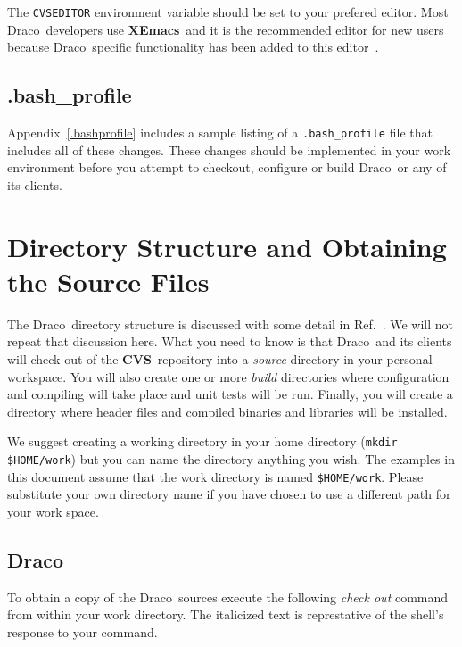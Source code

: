 \documentclass[11pt]{nmemo}
\newcommand{\comp}[1]{\normalfont\footnotesize\texttt{#1}\normalsize}
\newcommand{\draco}{{\normalfont\sffamily Draco}}
\newcommand{\cvs}{{\normalfont\bfseries CVS}}
\newcommand{\xemacs}{{\normalfont\bfseries XEmacs}}
\begin{document}
The \comp{CVSEDITOR} environment variable should be set to your
prefered editor.  Most \draco\ developers use \xemacs\ and it is the
recommended editor for new users because \draco\ specific
functionality has been added to this editor~\cite{xtm:9909}.

\subsection{.bash\_profile}

Appendix~\ref{.bashprofile} includes a sample listing of a
\comp{.bash\_profile} file that includes all of these changes.  These
changes should be implemented in your work environment before you
attempt to checkout, configure or build \draco\ or any of its clients.



\section{Directory Structure and Obtaining the Source Files}

The \draco\ directory structure is discussed with some detail in
Ref.~\cite{draco-build}.  We will not repeat that discussion here.
What you need to know is that \draco\ and its clients will check out
of the \cvs\ repository into a \emph{source} directory in your
personal workspace.  You will also create one or more \emph{build}
directories where configuration and compiling will take place and unit
tests will be run.  Finally, you will create a directory where header
files and compiled binaries and libraries will be installed.

We suggest creating a working directory in your home directory
(\comp{mkdir \${HOME}/work}) but you can name the directory anything
you wish.  The examples in this document assume that the work
directory is named \comp{\${HOME}/work}.  Please substitute your own
directory name if you have chosen to use a different path for your
work space.

\subsection{\draco}

To obtain a copy of the \draco\ sources execute the following
\emph{check out} command from within your work directory.  The
italicized text is represtative of the shell's response to your
command.
\end{document}
